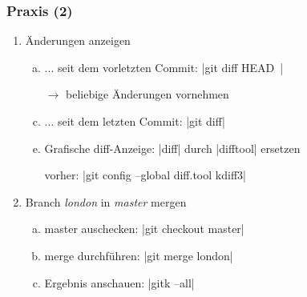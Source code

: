 \documentclass{beamer}
\begin{document}
\begin{frame}[fragile,label=uebung20]
\frametitle{Praxis (2)}
\begin{enumerate}
 \setcounter{enumi}{\value{taskcounter}}

 \item Änderungen anzeigen
 \begin{enumerate}[a)]
  \item ... seit dem vorletzten Commit: \cverb|git diff HEAD~|
  \item[$\rightarrow$] beliebige Änderungen vornehmen
  \item ... seit dem letzten Commit: \cverb|git diff|
  \item[]
  \item Grafische diff-Anzeige: \cverb|diff| durch \cverb|difftool| ersetzen
  \item[] vorher: \cverb|git config --global diff.tool kdiff3|
  \end{enumerate}
  \item Branch \textit{london} in \textit{master} mergen
  \begin{enumerate}[a)]
   \item master auschecken: \cverb|git checkout master|
   \item merge durchführen: \cverb|git merge london|
   \item Ergebnis anschauen: \cverb|gitk --all|
  \end{enumerate}

 \setcounter{taskcounter}{\value{enumi}}
\end{enumerate}



\end{frame}


\end{document}
